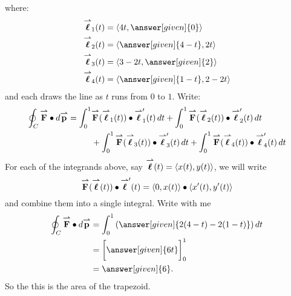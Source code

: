 \documentclass{ximera}
\begin{document}
\begin{example}
\begin{explanation}
\begin{image}
    \end{image}
    where:
    \begin{align*}
      \vecl_1(t) &= \vector{4t,\answer[given]{0}}\\
      \vecl_2(t) &= \vector{\answer[given]{4-t},2t}\\
      \vecl_3(t) &= \vector{3-2t,\answer[given]{2}}\\
      \vecl_4(t) &= \vector{\answer[given]{1-t},2-2t}
    \end{align*}
    and each draws the line as $t$ runs from $0$ to $1$.  Write:
    \begin{align*}
      \oint_C \vec{F}\dotp\d\vec{p} = \int_0^1 &\vec{F}(\vecl_1(t))\dotp \vecl_1'(t) \d t
    + \int_0^1 \vec{F}(\vecl_2(t))\dotp \vecl_2'(t) \d t\\
    &+ \int_0^1 \vec{F}(\vecl_3(t))\dotp \vecl_3'(t) \d t
    + \int_0^1 \vec{F}(\vecl_4(t))\dotp \vecl_4'(t) \d t
    \end{align*}
    For each of the integrands above, say $\vecl(t) =
    \vector{x(t),y(t)}$, we will write
    \[
    \vec{F}(\vecl(t))\dotp \vecl'(t) = \vector{0,x(t)} \dotp \vector{x'(t),y'(t)}
    \]
    and combine them into a single integral. Write with me
    \begin{align*}
      \oint_C \vec{F}\dotp\d\vec{p} &= \int_0^1 \left(\answer[given]{2(4-t) -2(1-t)} \right)\d t\\
      &= \eval{\answer[given]{6t}}_0^1\\
      &=\answer[given]{6}. 
    \end{align*}
    So the this is the area of the trapezoid.
  \end{explanation}
\end{example}
\end{document}
